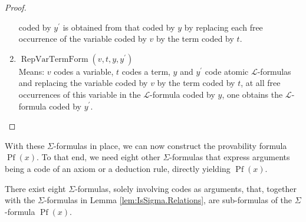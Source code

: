 \begin{proof}
\begin{enumerate}
        coded by $y^\prime$ is obtained from that coded by $y$ by replacing each free occurrence of 
        the variable coded by $v$ by the term coded by $t$.
        \item $\operatorname{RepVarTermForm}(v, t, y, y^\prime)$\\
        Means: $v$ codes a variable, $t$ codes a term, $y$ and $y^\prime$ code atomic 
        $\mathcal{L}$-formulas and replacing the variable coded by $v$ by the term coded by $t$, 
        at all free occurrences of this variable in the $\mathcal{L}$-formula coded by $y$, 
        one obtains the $\mathcal{L}$-formula coded by $y^\prime$.
    \end{enumerate}
\end{proof}

With these $\Sigma$-formulas in place, 
we can now construct the provability formula $\operatorname{Pf}(x)$.
To that end, we need eight other $\Sigma$-formulas that express arguments being 
a code of an axiom or a deduction rule, directly yielding $\operatorname{Pf}(x)$.

\begin{lemma}
    \label{lem:IsSigma.Ax+...+IsSigma.Pf}
    There exist eight $\Sigma$-formulas, solely involving codes as arguments, that, together with
    the $\Sigma$-formulas in Lemma \ref{lem:IsSigma.Relations}, are sub-formulas of
    the $\Sigma$-formula $\operatorname{Pf}(x)$.
\end{lemma}

